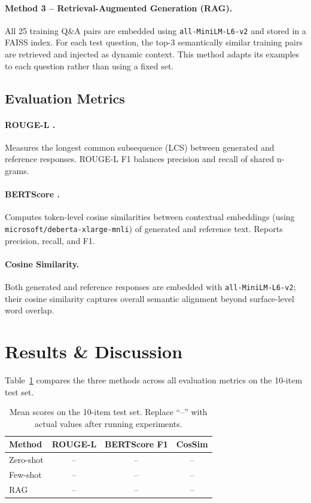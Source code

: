 \documentclass[11pt]{article}
\begin{document}
\paragraph{Method 3 – Retrieval-Augmented Generation (RAG).}
All 25 training Q\&A pairs are embedded using
\texttt{all-MiniLM-L6-v2} \citep{reimers2019sentencebert} and stored in
a FAISS \citep{johnson2019faiss} index.
For each test question, the top-3 semantically similar training pairs are
retrieved and injected as dynamic context.
This method adapts its examples to each question rather than using a
fixed set.

\subsection{Evaluation Metrics}

\paragraph{ROUGE-L \citep{lin2004rouge}.}
Measures the longest common subsequence (LCS) between generated and
reference responses.
ROUGE-L F1 balances precision and recall of shared n-grams.

\paragraph{BERTScore \citep{zhang2020bertscore}.}
Computes token-level cosine similarities between contextual embeddings
(using \texttt{microsoft/deberta-xlarge-mnli}) of generated and reference
text.
Reports precision, recall, and F1.

\paragraph{Cosine Similarity.}
Both generated and reference responses are embedded with
\texttt{all-MiniLM-L6-v2}; their cosine similarity captures overall
semantic alignment beyond surface-level word overlap.

\section{Results \& Discussion}

Table~\ref{tab:results} compares the three methods across all evaluation
metrics on the 10-item test set.

\begin{table}[h]
\centering
\small
\begin{tabular}{lccc}
\toprule
\textbf{Method} & \textbf{ROUGE-L} & \textbf{BERTScore F1} & \textbf{CosSim} \\
\midrule
Zero-shot  & -- & -- & -- \\
Few-shot   & -- & -- & -- \\
RAG        & -- & -- & -- \\
\bottomrule
\end{tabular}
\caption{Mean scores on the 10-item test set.
         Replace ``--'' with actual values after running experiments.}
\label{tab:results}
\end{table}
\end{document}
